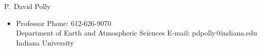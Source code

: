 \documentclass[10pt]{article}
\newenvironment{innerlist}[1][\enskip\textbullet]%
        {\begin{itemize}[#1,leftmargin=*,parsep=0pt,itemsep=0pt,topsep=0pt,partopsep=0pt]}
        {\end{itemize}}
\newcommand{\halfblankline}{\quad\vspace{-0.5\baselineskip}\pagebreak[3]}
\begin{document}
P.\ David Polly
\begin{innerlist}
\item[] Professor \hfill {Phone: 612-626-9070}\\
  Department of Earth and Atmospheric Sciences \hfill{E-mail: pdpolly@indiana.edu}\\
  Indiana University
\end{innerlist}

\halfblankline

\end{document}
